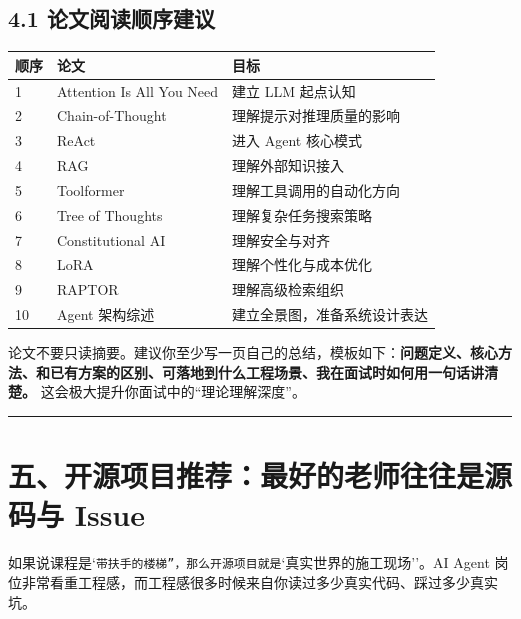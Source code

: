 \subsection{4.1 论文阅读顺序建议}

\begingroup
\scriptsize
\setlength{\tabcolsep}{3pt}
\begin{longtable}{|p{}|p{}|p{}|}
\hline
顺序 & 论文 & 目标 \\ \hline
1 & Attention Is All You Need & 建立 LLM 起点认知 \\ \hline
2 & Chain-of-Thought & 理解提示对推理质量的影响 \\ \hline
3 & ReAct & 进入 Agent 核心模式 \\ \hline
4 & RAG & 理解外部知识接入 \\ \hline
5 & Toolformer & 理解工具调用的自动化方向 \\ \hline
6 & Tree of Thoughts & 理解复杂任务搜索策略 \\ \hline
7 & Constitutional AI & 理解安全与对齐 \\ \hline
8 & LoRA & 理解个性化与成本优化 \\ \hline
9 & RAPTOR & 理解高级检索组织 \\ \hline
10 & Agent 架构综述 & 建立全景图，准备系统设计表达 \\ \hline
\end{longtable}
\endgroup

论文不要只读摘要。建议你至少写一页自己的总结，模板如下：\textbf{问题定义、核心方法、和已有方案的区别、可落地到什么工程场景、我在面试时如何用一句话讲清楚。} 这会极大提升你面试中的``理论理解深度''。


\bigskip\hrule\bigskip

\section{五、开源项目推荐：最好的老师往往是源码与 Issue}

如果说课程是`\texttt{带扶手的楼梯''，那么开源项目就是}`真实世界的施工现场''。AI Agent 岗位非常看重工程感，而工程感很多时候来自你读过多少真实代码、踩过多少真实坑。


